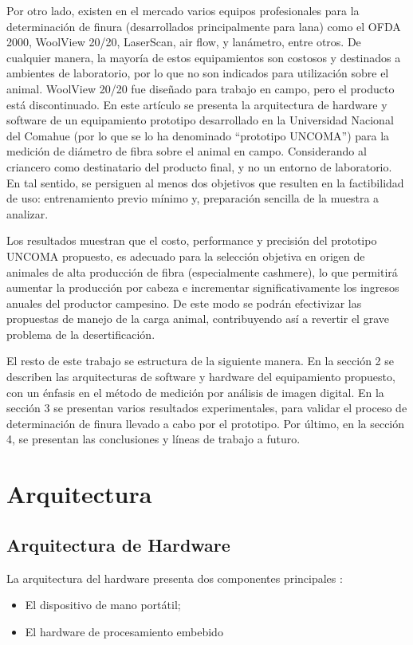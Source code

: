 \documentclass[runningheads,a4paper]{llncs}
\begin{document}
Por otro lado, existen en el mercado varios equipos profesionales para la determinación de finura (desarrollados principalmente para lana) como el OFDA 2000, WoolView 20/20, LaserScan, air flow, y lanámetro, entre otros. De cualquier manera, la mayoría de estos equipamientos son costosos y destinados a ambientes de laboratorio, por lo que no son indicados para utilización sobre el animal. WoolView 20/20 fue diseñado para trabajo en campo, pero el producto está discontinuado.
En este artículo se presenta la arquitectura de hardware y software de un equipamiento prototipo desarrollado en la Universidad Nacional del Comahue (por lo que se lo ha denominado ``prototipo UNCOMA'') para la medición de diámetro de fibra sobre el animal en campo. Considerando al criancero como destinatario del 
producto final, y no un entorno de laboratorio. En tal sentido, se persiguen al menos dos objetivos que 
resulten en la factibilidad de uso: entrenamiento previo mínimo y, preparación sencilla de la muestra a 
analizar.  
 
Los resultados muestran que el costo, performance y precisión del prototipo UNCOMA propuesto, es adecuado para la selección objetiva en origen de animales de alta producción de fibra (especialmente cashmere), lo que permitirá aumentar la producción por cabeza e incrementar significativamente los ingresos anuales del productor campesino. De este modo se podrán efectivizar las propuestas de manejo de la carga animal, contribuyendo así a revertir el grave problema de la desertificación.

El resto de este trabajo se estructura de la siguiente manera. En la sección 2 se describen
las arquitecturas de software y hardware del equipamiento propuesto, con un énfasis en
el método de medición por análisis de imagen digital. En la sección 3 se presentan varios
resultados experimentales, para validar el proceso de determinación de finura llevado a cabo por el prototipo.
Por último, en la sección 4, se presentan las conclusiones y líneas de trabajo a futuro.

\section{Arquitectura}

\subsection{Arquitectura de Hardware}

La arquitectura del hardware presenta dos componentes principales :
\begin{itemize}
\item El dispositivo de mano portátil;
\item El hardware de procesamiento embebido
\end{itemize}
\end{document}
